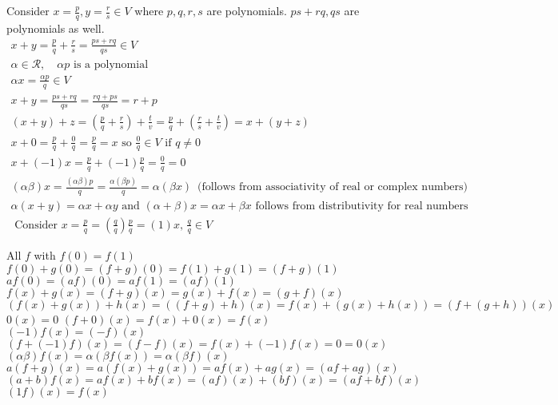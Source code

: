 \documentclass[twoside]{amsart}
\theoremstyle{plain}
\theoremstyle{definition}
\newcommand{\exercisehead}[1]
  {
   \noindent{\small\bf Exercise #1.}
   \smallskip}
\begin{document}
\exercisehead{1}
Consider $x = \frac{p}{q}, y = \frac{r}{s} \in V$ where $p,q,r,s$ are polynomials.  $ps+rq, qs$ are polynomials as well.  
\[
\begin{gathered}
x+y = \frac{p}{q} + \frac{r}{s} = \frac{ ps + rq}{qs} \in V  \\
\alpha \in \mathcal{R}, \quad \alpha p \text{ is a polynomial } \\
\alpha x = \frac{ \alpha p }{q} \in V \\
x+ y = \frac{ ps + rq}{qs} = \frac{rq +ps}{qs} = r+ p \\
(x +y ) + z = \left( \frac{p}{q} + \frac{r}{s} \right) + \frac{t}{v} = \frac{p}{q} + \left( \frac{r}{s} + \frac{t}{v} \right) = x + (y+z)  \\
x + 0 = \frac{p}{q} + \frac{0}{q} = \frac{p}{q} = x \text{ so } \frac{0}{q} \in V \text{ if } q \neq 0 \\
x + (-1)x = \frac{p}{q} + (-1) \frac{p}{q} = \frac{0}{q} = 0 \\
(\alpha \beta)x = \frac{ (\alpha \beta )p}{q} = \frac{ \alpha (\beta p) }{q} = \alpha (\beta x ) \, \text{ (follows from associativity of real or complex numbers) } \\
\alpha( x+ y) = \alpha x + \alpha y \text{ and } (\alpha + \beta)x = \alpha x + \beta x \text{ follows from distributivity for real numbers } \\
\text{ Consider } x = \frac{p}{q} = \left( \frac{q}{q} \right) \frac{p}{q} = (1)x, \, \frac{q}{q} \in V
\end{gathered}
\]

\exercisehead{3} All $f$ with $f(0) = f(1)$ \medskip \\
$f(0) + g(0) = (f+g)(0) = f(1) + g(1) = (f+g)(1)$ \smallskip \\
$af(0) = (af)(0) = af(1) = (af)(1)$ \smallskip \\
$f(x) + g(x) = (f+g)(x) = g(x) + f(x) = (g+f)(x)$ \smallskip \\
$(f(x) +g(x))+h(x) = ((f+g)+h)(x) = f(x) + (g(x) +h(x)) = (f+ (g+h))(x)$ \smallskip \\
$0(x) = 0$  \quad $(f+0)(x) = f(x) + 0(x) = f(x)$ \smallskip \\
$(-1)f(x) = (-f)(x)$ \quad \quad \quad $(f+(-1)f)(x) = (f-f)(x) = f(x) + (-1)f(x) = 0 = 0(x)$  \smallskip \\
$(\alpha \beta)f(x) = \alpha (\beta f(x)) = \alpha (\beta f)(x)$ \smallskip \\
$a(f+g)(x) = a(f(x) + g(x)) = af(x) + ag(x) = (af+ag)(x)$ \smallskip \\
$(a+b)f(x) = af(x) + bf(x) = (af)(x) + (bf)(x) = (af+bf)(x)$ \smallskip \\
$(1f)(x) = f(x)$
\end{document}
